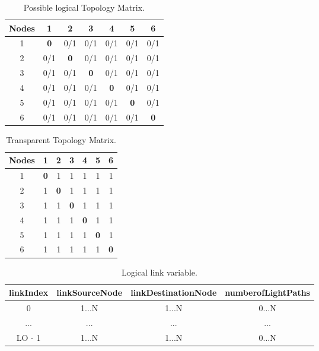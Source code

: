 \begin{table}[H]
	\centering	
	\begin{tabular}{|c|c|c|c|c|c|c|}
		\hline
		\multicolumn{1}{|l|}{\textbf{Nodes}} & 1   & 2   & 3   & 4   & 5   & 6   \\ \hline
		1                           & \textbf{0}   & 0/1 & 0/1 & 0/1 & 0/1 & 0/1 \\ \hline
		2                           & 0/1 & \textbf{0}   & 0/1 & 0/1 & 0/1 & 0/1 \\ \hline
		3                           & 0/1 & 0/1 & \textbf{0}   & 0/1 & 0/1 & 0/1 \\ \hline
		4                           & 0/1 & 0/1 & 0/1 & \textbf{0}   & 0/1 & 0/1 \\ \hline
		5                           & 0/1 & 0/1 & 0/1 & 0/1 & \textbf{0}   & 0/1 \\ \hline
		6                           & 0/1 & 0/1 & 0/1 & 0/1 & 0/1 & \textbf{0}   \\ \hline
	\end{tabular}
	\caption{Possible logical Topology Matrix.}
	\label{logical_topology}
\end{table}
\begin{table}[H]
	\centering	
	\begin{tabular}{|c|c|c|c|c|c|c|}
		\hline
		\multicolumn{1}{|l|}{\textbf{Nodes}} & 1   & 2   & 3   & 4   & 5   & 6  \\ \hline
		1                           & \textbf{0}   & 1 & 1 & 1 & 1 & 1 \\ \hline
		2                           & 1 & \textbf{0}   & 1 & 1 & 1 & 1 \\ \hline
		3                           & 1 & 1 & \textbf{0}   & 1 & 1 & 1 \\ \hline
		4                           & 1 & 1 & 1 & \textbf{0}   & 1 & 1 \\ \hline
		5                           & 1 & 1 & 1 & 1 & \textbf{0}   & 1 \\ \hline
		6                           & 1 & 1 & 1 & 1 & 1 & \textbf{0}   \\ \hline
	\end{tabular}
	\caption{Transparent Topology Matrix.}
	\label{Transparentlogical_topology}
\end{table}

\begin{table}[H]
	\centering
	\begin{tabular}{|c|c|c|c|}
		\hline
		\textbf{linkIndex} & \textbf{linkSourceNode} & \textbf{linkDestinationNode} & \textbf{numberofLightPaths} \\ \hline
		0     & 1...N            & 1...N                 & 0...N                 \\ \hline
		...   & ...              & ...                   & ...                   \\ \hline
		LO - 1    & 1...N            & 1...N                 & 0...N                 \\ \hline
	\end{tabular}
	\caption{Logical link variable.}
	\label{logicalLink_variable}
\end{table}

